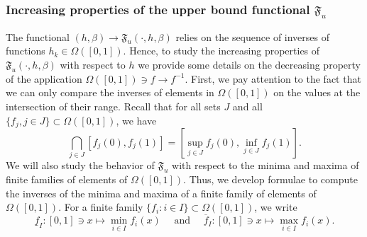 \documentclass{article}
\def\fset{\Omega([0,1])}
\def\Fu{\mathfrak{F}_u}
\def\red#1{#1}
\def\blue#1{#1}
\begin{document}
	\subsubsection{\blue{Increasing} properties of the upper bound functional $\Fu$}
	The \red{functional} $(h,\beta)\to \Fu(\cdot,h,\beta)$ relies on the \blue{sequence of inverses of functions $h_k\in\fset$}. Hence, to study \red{the} increasing properties of $\Fu(\cdot,h,\beta)$ with respect to $h$ we \red{provide} some details on the decreasing property of the application $\fset\ni f\to f^{-1}$. First, we pay attention to the fact that we can only compare the inverses \blue{of elements in $\fset$} on the values at the intersection of their range. \blue{Recall that} for all sets $J$ and all \blue{$\{f_j,j\in J\}\subset \fset$}, we have
\[		
		\blue{\bigcap_{j\in J}[f_j(0),f_j(1)]=\left[\sup_{j\in J} f_j(0),\inf_{j\in J}f_j(1)\right]}.
	\]
	\blue{We will also study the behavior of $\Fu$ with respect to the minima and maxima of finite families of elements of $\fset$. Thus, we develop formulae to compute} the inverses of the minima and maxima of a finite family of elements of $\fset$. For a finite family \blue{$\{f_i: i\in I\}\subset \fset$}, we write
	\begin{equation}
		\label{minmaxfct}
		\blue{\underline{f}_I:[0,1]\ni x\mapsto \min_{i\in I} f_i(x)}\quad \text{ and } \quad 
		\blue{\overline{f}_I:[0,1]\ni x\mapsto \max_{i\in I} f_i(x)}.
	\end{equation}
\end{document}
